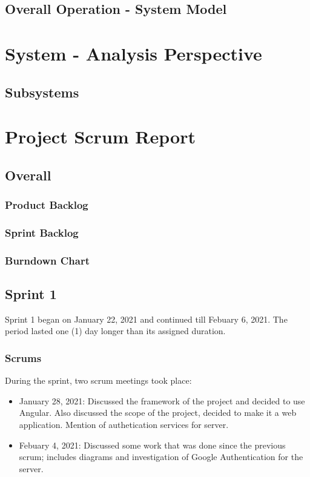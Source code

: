 \documentclass{article}
\begin{document}
\subsection{Overall Operation - System Model}


\newpage
\section{System - Analysis Perspective}
\subsection{Subsystems}

\newpage
\section{Project Scrum Report}
\subsection{Overall}
\subsubsection{Product Backlog} %

\subsubsection{Sprint Backlog} %

\subsubsection{Burndown Chart}

\subsection{Sprint 1}
Sprint 1 began on January 22, 2021 and continued till Febuary 6, 2021. The period lasted one (1) day longer than its assigned duration.
\subsubsection{Scrums}
During the sprint, two scrum meetings took place:
\begin{itemize}
 \item January 28, 2021: Discussed the framework of the project and decided to use Angular. Also discussed the scope of the project, decided to make it a web application. Mention of authetication services for server.
\item Febuary 4, 2021: Discussed some work that was done since the previous scrum;  includes diagrams and investigation of Google Authentication for the server.
\end{itemize}
\end{document}
